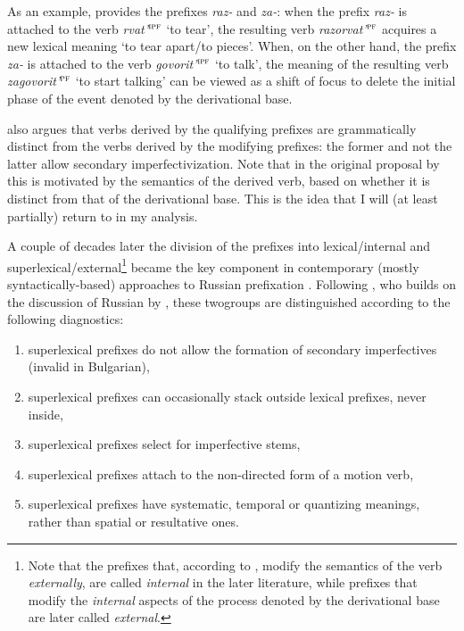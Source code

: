 As an example, \citet{Isachenko:60} provides the prefixes \textit{raz-} and \textit{za-}: when the prefix \textit{raz-} is attached to the verb \textit{rvat'}$^{\textsc{ipf}}$ `to tear', the resulting verb \textit{razorvat'}$^{\textsc{pf}}$ acquires a new lexical meaning `to tear apart/to pieces'. When, on the other hand, the prefix \textit{za-} is attached to the verb \textit{govorit'}$^{\textsc{ipf}}$ `to talk', the meaning of the resulting verb \textit{zagovorit'}$^{\textsc{pf}}$ `to start talking' can be viewed as a shift of focus to delete the initial phase of the event denoted by the derivational base.

\citet{Isachenko:60} also argues that verbs derived by the qualifying prefixes are grammatically distinct from the verbs derived by the modifying prefixes: the former and not the latter allow secondary imperfectivization. Note that in the original proposal by \citet{Isachenko:60} this is motivated by the semantics of the derived verb, based on whether it is distinct from that of the derivational base. This is the idea that I will (at least partially) return to in my analysis.

A couple of decades later the division of the prefixes into lexical\slash internal and superlexical\slash external\footnote{Note that the prefixes that, according to \citet{Isachenko:60}, modify the semantics of the verb \textit{externally}, are called \textit{internal} in the later literature, while prefixes that modify the \textit{internal} aspects of the process denoted by the derivational base are later called \textit{external}.} became the key component in contemporary (mostly syn\-tac\-tically-based) approaches to Russian prefixation \citep{Schoorlemmer:95, Babko-Malaya:99, Borik:02, Gehrke:04, Ramchand:04, Romanova:04, Romanova:06, Svenonius:04a, Svenonius:04b, DiSciullo:05}. Following \citet[229]{Svenonius:04b}, who builds on the discussion of Russian by \citet{Schoorlemmer:95}, these two\linebreak groups are distinguished according to the following diagnostics:

\begin{enumerate}
\item superlexical prefixes do not allow the formation of secondary imperfectives (invalid in Bulgarian), 
\item superlexical prefixes can occasionally stack outside lexical prefixes, never inside, 
\item superlexical prefixes select for imperfective stems, 
\item superlexical prefixes attach to the non-directed form of a motion verb,
\item superlexical prefixes have systematic, temporal or quantizing meanings, rather than spatial or resultative ones.
\end{enumerate}

